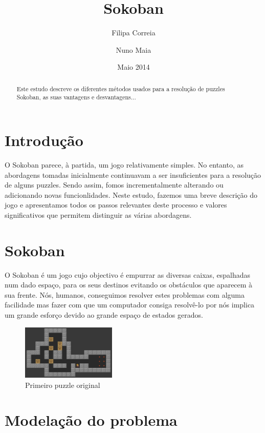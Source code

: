 \documentclass[twocolumn]{article}
\title{Sokoban}
\author{
  Filipa Correia
  \and
  Nuno Maia
}
\date{Maio 2014}
\begin{document}
\maketitle

\begin{abstract}
Este estudo descreve os diferentes métodos usados para a resolução de puzzles Sokoban, as suas vantagens e desvantagens...
\end{abstract}

\section{Introdução}
O Sokoban parece, à partida, um jogo relativamente simples. No entanto, as abordagens tomadas inicialmente continuavam a ser insuficientes para a resolução de alguns puzzles. Sendo assim, fomos incrementalmente alterando ou adicionando novas funcionlidades. Neste estudo, fazemos uma breve descrição do jogo e apresentamos todos os passos relevantes deste processo e valores significativos que permitem distinguir as várias abordagens.

\section{Sokoban}

O Sokoban é um jogo cujo objectivo é empurrar as diversas caixas, espalhadas num dado espaço, para os seus destinos evitando os obstáculos que aparecem à sua frente. Nós, humanos, conseguimos resolver estes problemas com alguma facilidade mas fazer com que um computador consiga resolvê-lo por nós implica um grande esforço devido ao grande espaço de estados gerados.

\begin{figure}[ht!]
\centering
\includegraphics[width=0.4\textwidth]{sokoban.png}
\caption{Primeiro puzzle original}
\end{figure}

\section{Modelação do problema}
\end{document}
